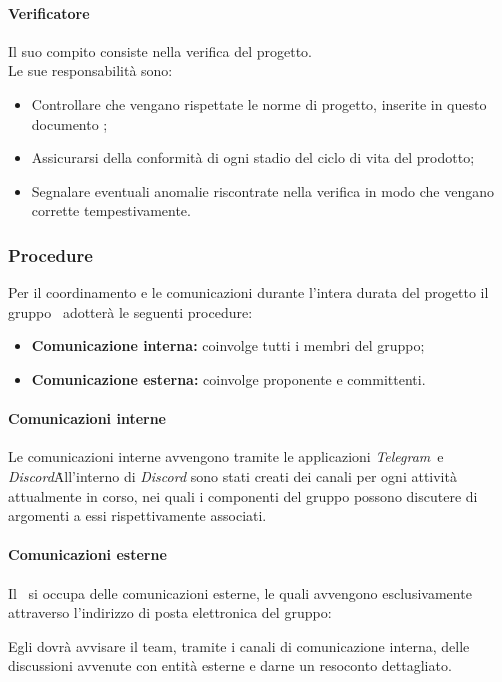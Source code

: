       \paragraph{Verificatore}
        Il suo compito consiste nella verifica del progetto.\\
        Le sue responsabilità sono:
        \begin{itemize}
          \item Controllare che vengano rispettate le norme di progetto, inserite in questo documento \docNameVersionNdP;
          \item Assicurarsi della conformità di ogni stadio del ciclo di vita del prodotto;
          \item Segnalare eventuali anomalie riscontrate nella verifica in modo che vengano corrette tempestivamente.
        \end{itemize}
  \subsubsection {Procedure}
  Per il coordinamento e le comunicazioni durante l'intera durata del progetto il gruppo \groupName\ adotterà le seguenti procedure:
  \begin{itemize}
    \item \textbf{Comunicazione interna:} coinvolge tutti i membri del gruppo;
    \item  \textbf{Comunicazione esterna:} coinvolge proponente e committenti.
  \end{itemize}
  \paragraph{Comunicazioni interne}
  Le comunicazioni interne avvengono tramite le applicazioni \textit{Telegram}\glo\ e \textit{Discord}\glo\. All'interno di \textit{Discord} sono stati creati dei canali per ogni attività attualmente in corso, nei quali i componenti del gruppo possono discutere di argomenti a essi rispettivamente associati.
  \paragraph{Comunicazioni esterne}
  Il \roleProjectManager\ si occupa delle comunicazioni esterne, le quali avvengono esclusivamente attraverso l'indirizzo di posta elettronica del gruppo:\\
  \begin{center}
    \groupEmail
  \end{center}
  Egli dovrà avvisare il team, tramite i canali di comunicazione interna, delle discussioni avvenute con entità esterne e darne un resoconto dettagliato.
